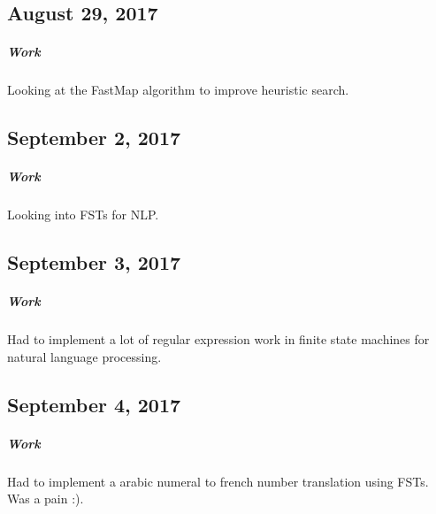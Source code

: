 \documentclass[a4paper]{article}
\begin{document}
\subsection{August 29, 2017}
\subparagraph{Work}
Looking at the FastMap algorithm to improve heuristic search.

\subsection{September 2, 2017}
\subparagraph{Work}
Looking into FSTs for NLP.

\subsection{September 3, 2017}
\subparagraph{Work}
Had to implement a lot of regular expression work in finite state machines for natural language processing.

\subsection{September 4, 2017}
\subparagraph{Work}
Had to implement a arabic numeral to french number translation using FSTs. Was a pain :).
\end{document}
